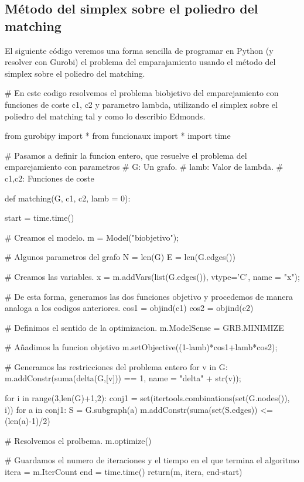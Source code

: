\documentclass[twoside,a4paper,openright,12pt]{book}
\begin{document}
\subsection{Método del simplex sobre el poliedro del matching}
El siguiente código veremos una forma sencilla de programar en Python (y resolver con Gurobi) el problema del emparajamiento usando el método del simplex sobre el poliedro del matching.
\begin{pythone}
# En este codigo resolvemos el problema biobjetivo del emparejamiento con funciones de coste c1, c2 y parametro lambda, utilizando el simplex sobre el poliedro del matching tal y como lo describio Edmonds.

from gurobipy import *
from funcionaux import *
import time


# Pasamos a definir la funcion entero, que resuelve el problema del emparejamiento con parametros
# G: Un grafo.
# lamb: Valor de lambda.
# c1,c2: Funciones de coste

def matching(G, c1, c2, lamb = 0):
    
    start = time.time()
    
    # Creamos el modelo.
    m = Model("biobjetivo");
    
    
    # Algunos parametros del grafo
    N = len(G)
    E = len(G.edges())
    
    # Creamos las variables.
    x = m.addVars(list(G.edges()), vtype='C', name = "x");
    
    # De esta forma, generamos las dos funciones objetivo y procedemos de manera analoga a los codigos anteriores.  
    cos1 = objind(c1)
    cos2 = objind(c2)
    
    # Definimos el sentido de la optimizacion.
    m.ModelSense = GRB.MINIMIZE
    
    # Añadimos la funcion objetivo
    m.setObjective((1-lamb)*cos1+lamb*cos2); 
    
    # Generamos las restricciones del problema entero
    for v in G:
        m.addConstr(suma(delta(G,[v])) == 1, name = "delta" + str(v));
        
    for i in range(3,len(G)+1,2):
        conj1 = set(itertools.combinations(set(G.nodes()), i))
        for a in conj1:
            S = G.subgraph(a)
            m.addConstr(suma(set(S.edges)) <= (len(a)-1)/2)
    
    # Resolvemos el prolbema.
    m.optimize()
    
    # Guardamos el numero de iteraciones y el tiempo en el que termina el algoritmo
    itera = m.IterCount
    end = time.time()
    return(m, itera, end-start)
\end{pythone}
\end{document}

